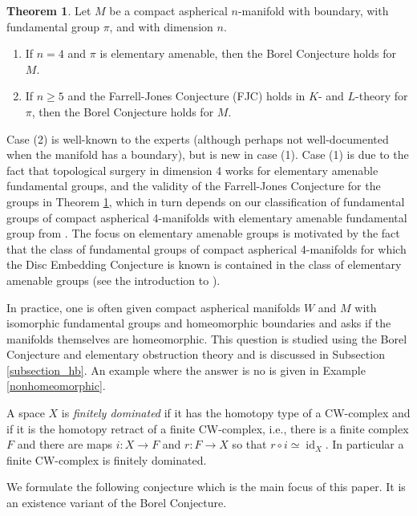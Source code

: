 \documentclass[12pt]{amsart}
\theoremstyle{definition}
\newtheorem{maintheorem}{Theorem}
\DeclareMathOperator{\id}{id}
\begin{document}
\begin{maintheorem} \label{BC}
Let $M$ be a compact aspherical $n$-manifold with boundary, with fundamental group $\pi$, and with dimension $n$.   
\begin{enumerate}
 \item If $n = 4$ and $\pi$ is elementary amenable, then the Borel Conjecture holds for $M$.
 \item If $n \geq 5$ and the Farrell-Jones Conjecture (FJC) holds in $K$- and $L$-theory for $\pi$, then the Borel Conjecture holds for $M$.
\end{enumerate}
\end{maintheorem}

Case (2) is well-known to the experts (although perhaps not well-documented when the manifold has a boundary), but is new in case (1).   Case (1) is due to  the fact that topological surgery in dimension 4 works for elementary amenable fundamental groups, and the validity of the Farrell-Jones Conjecture for the groups in Theorem \ref{BC}, which in turn depends on our classification of fundamental groups of compact aspherical 4-manifolds with elementary amenable fundamental group from \cite{DH2}.  
The focus on elementary amenable groups is motivated by the fact that the class of fundamental groups of compact aspherical 4-manifolds for which the Disc Embedding Conjecture \cite{BKKPR} is known is contained in the class of  elementary amenable groups  (see the introduction to \cite{DH2}).

In practice,  one is often given compact aspherical manifolds $W$ and $M$ with isomorphic  fundamental groups  and homeomorphic boundaries and asks if the manifolds themselves are homeomorphic.   This question is studied using the Borel Conjecture and elementary obstruction theory and is discussed in Subsection \ref{subsection_hb}.   An example where the answer is no is given in Example \ref{nonhomeomorphic}.

A space $X$ is {\em finitely dominated} if it has the homotopy type of a CW-complex and if it is the homotopy retract of a finite CW-complex, i.e., there is a finite complex $F$ and there are maps $i: X \to F$ and $r : F \to X$ so that $r \circ i \simeq \id_X$.  In particular a finite CW-complex is finitely dominated.


We formulate the following conjecture which is the main focus of this paper.   It is an existence variant of the Borel Conjecture.
\end{document}
